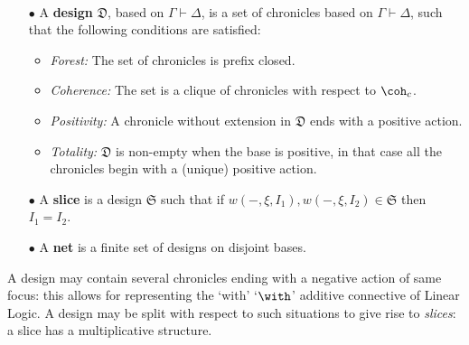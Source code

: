 \documentclass{LMCS}
\newcommand{\design}[1]{{\mathfrak{#1}}}
\begin{document}
 

\begin{defi}~
  \begin{itemize}
\item[$\bullet$] A {\bf design} $\design{D}$, based on
  $\Gamma\vdash\Delta$, is a set of chronicles based on
  $\Gamma\vdash\Delta$, such that the following conditions are
  satisfied:
\begin{itemize}[label=$-$]
\item  {\em Forest:} The set of chronicles is prefix closed.
\item  {\em Coherence:} The set is a clique of chronicles with respect to $\coh_c$. 
\item {\em Positivity:} A chronicle without extension in $\design{D}$ ends with a positive action.
\item {\em Totality:} $\design{D}$ is non-empty when the base is positive, in that case all the chronicles begin with a (unique) positive action.
\end{itemize}
\item[$\bullet$]  A {\bf slice} is a design $\design{S}$ such that if $w(-,\xi,I_1), w(-,\xi,I_2) \in \design{S}$ then $I_1 = I_2$. 
\item[$\bullet$]  A {\bf net} is a finite set of designs on disjoint bases. 
\end{itemize}
\end{defi}

A design may contain several chronicles ending with a negative action of same focus: this allows for representing the `with' `$\with$' additive connective of Linear Logic. A design may be split with respect to such situations to give rise to {\em slices}: a slice has a multiplicative structure.
\end{document}
